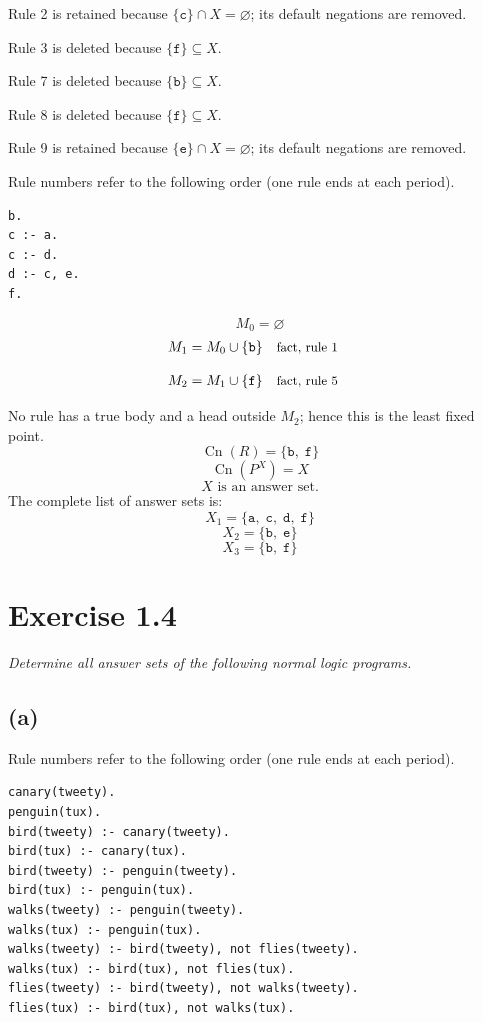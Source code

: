 \documentclass[a4paper,11pt]{article}
\newif\ifexplain
\newcommand{\explain}[1]{\ifexplain\begin{erklbox}#1\end{erklbox}\fi}
\newcommand{\why}[1]{\text{\small #1}}
\newcommand{\angabe}[1]{\textit{#1}\par}
\newcommand{\aufgabe}[1]{\section*{Exercise #1}}
\newcommand{\teil}[1]{\subsection*{(#1)}}
\newcommand{\at}[1]{\texttt{#1}}
\begin{document}
Rule 2 is retained because $\{\at{c}\}\cap X=\varnothing$; its default negations are removed.

Rule 3 is deleted because $\{\at{f}\}\subseteq X$.

Rule 7 is deleted because $\{\at{b}\}\subseteq X$.

Rule 8 is deleted because $\{\at{f}\}\subseteq X$.

Rule 9 is retained because $\{\at{e}\}\cap X=\varnothing$; its default negations are removed.

Rule numbers refer to the following order (one rule ends at each period).
\begin{small}
\begin{verbatim}
b.
c :- a.
c :- d.
d :- c, e.
f.
\end{verbatim}
\end{small}
\explain{Beim Redukt bleibt die Kandidatenmenge fest. Wir entscheiden zuerst, welche Regeln wegfallen. Erst danach berechnen wir aus den verbleibenden positiven Regeln die kleinste abgeschlossene Menge. Ein Modell allein reicht nicht: Diese Menge muss genau der Kandidat sein.}
\[
M_0=\varnothing
\]
\begin{align*}
M_{1} &= M_{0}\cup \{\at{b}\} && \why{fact, rule 1}
\end{align*}
\explain{Diese Regel hat keinen Körper. Ihr Kopf $\at{b}$ ist damit ein Fakt und muss in die Menge.}
\begin{align*}
M_{2} &= M_{1}\cup \{\at{f}\} && \why{fact, rule 5}
\end{align*}
\explain{Diese Regel hat keinen Körper. Ihr Kopf $\at{f}$ ist damit ein Fakt und muss in die Menge.}
No rule has a true body and a head outside $M_{2}$; hence this is the least fixed point.
\[
\operatorname{Cn}(R)=\{\at{b},\;\at{f}\}
\]
\[
\operatorname{Cn}(P^X)=X
\]
\[
\boxed{X\text{ is an answer set.}}
\]
The complete list of answer sets is:
\[
\boxed{X_1=\{\at{a},\;\at{c},\;\at{d},\;\at{f}\}}
\]
\[
\boxed{X_2=\{\at{b},\;\at{e}\}}
\]
\[
\boxed{X_3=\{\at{b},\;\at{f}\}}
\]
\aufgabe{1.4}
\angabe{Determine all answer sets of the following normal logic programs.}
\teil{a}
Rule numbers refer to the following order (one rule ends at each period).
\begin{small}
\begin{verbatim}
canary(tweety).
penguin(tux).
bird(tweety) :- canary(tweety).
bird(tux) :- canary(tux).
bird(tweety) :- penguin(tweety).
bird(tux) :- penguin(tux).
walks(tweety) :- penguin(tweety).
walks(tux) :- penguin(tux).
walks(tweety) :- bird(tweety), not flies(tweety).
walks(tux) :- bird(tux), not flies(tux).
flies(tweety) :- bird(tweety), not walks(tweety).
flies(tux) :- bird(tux), not walks(tux).
\end{verbatim}
\end{small}
\end{document}

